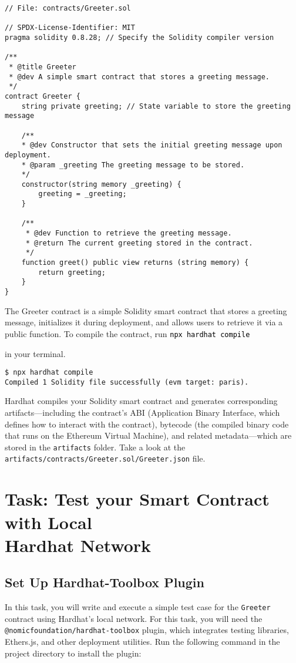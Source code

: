 \documentclass[12pt]{article}
\newcommand{\codegrey}[1]{%
  \texttt{\colorbox{black!4}{\textcolor{black}{#1}}}%
}
\begin{document}
\noindent
\begin{minipage}[c]{\textwidth}
    \begin{lstlisting}[language=Solidity]
// File: contracts/Greeter.sol

// SPDX-License-Identifier: MIT
pragma solidity 0.8.28; // Specify the Solidity compiler version

/**
 * @title Greeter
 * @dev A simple smart contract that stores a greeting message.
 */
contract Greeter {
    string private greeting; // State variable to store the greeting message

    /**
    * @dev Constructor that sets the initial greeting message upon deployment.
    * @param _greeting The greeting message to be stored.
    */
    constructor(string memory _greeting) {
        greeting = _greeting;
    }

    /**
     * @dev Function to retrieve the greeting message.
     * @return The current greeting stored in the contract.
     */
    function greet() public view returns (string memory) {
        return greeting;
    }
}
\end{lstlisting}
\end{minipage}

The Greeter contract is a simple Solidity smart contract that stores a greeting
message, initializes it during deployment, and allows users to retrieve it via
a public function. To compile the contract, run \codegrey{npx hardhat compile}
in your terminal.

\begin{verbatim}
$ npx hardhat compile
Compiled 1 Solidity file successfully (evm target: paris).
\end{verbatim}

Hardhat compiles your Solidity smart contract and generates corresponding
artifacts—including the contract's ABI (Application Binary Interface, which
defines how to interact with the contract), bytecode (the compiled binary code
that runs on the Ethereum Virtual Machine), and related metadata—which are
stored in the \texttt{artifacts} folder. Take a look at the
\texttt{artifacts/contracts/Greeter.sol/Greeter.json} file.

\section{Task: Test your Smart Contract with Local \\ Hardhat Network}

\subsection{Set Up Hardhat-Toolbox Plugin}
In this task, you will write and execute a simple test case for the
\texttt{Greeter} contract using Hardhat's local network. For this task, you will
need the \texttt{@nomicfoundation/hardhat-toolbox} plugin, which integrates
testing libraries, Ethers.js, and other deployment utilities. Run the following
command in the project directory to install the plugin:
\end{document}
